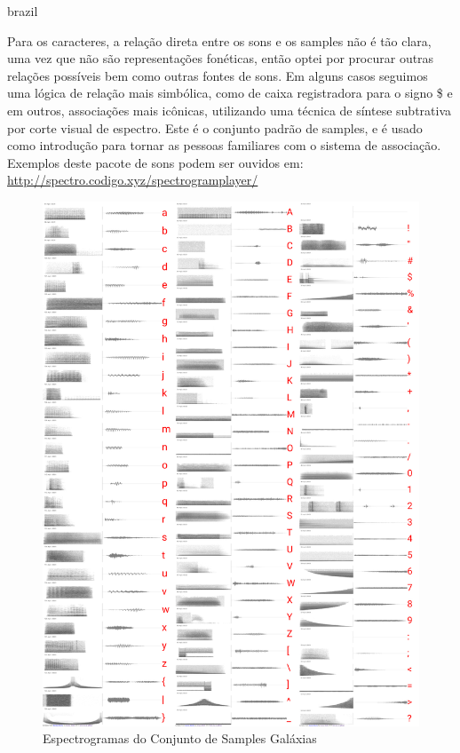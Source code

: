 \begin{otherlanguage*}{brazil}
\begin{description}
Para os caracteres, a relação direta entre os sons e os samples não é tão clara, uma vez que não são representações fonéticas, então optei por procurar outras relações possíveis bem como outras fontes de sons. Em alguns casos seguimos uma lógica de relação mais simbólica, como de caixa registradora para o signo \$ e em outros, associações mais icônicas, utilizando uma técnica de síntese subtrativa por corte visual de espectro. Este é o conjunto padrão de samples, e é usado como introdução para tornar as pessoas familiares com o sistema de associação. Exemplos deste pacote de sons podem ser ouvidos em: \url{http://spectro.codigo.xyz/spectrogramplayer/}

\begin{figure}[htb]
    \caption{\label{samplesgalaxias}Espectrogramas do Conjunto de Samples Galáxias}
    \begin{center}
        \includegraphics[width=0.7\linewidth]{pictures/cap3/bandagalaxias.jpg}
    \end{center}
\end{figure}



\end{description}
\end{otherlanguage*}

